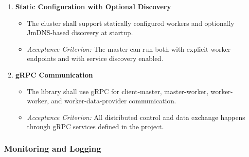 \documentclass{scrartcl}
\begin{document}
\begin{enumerate}[label=\textbf{FR-WDC-\arabic*}]
    \item \textbf{Static Configuration with Optional Discovery}
          \begin{itemize}
              \item The cluster shall support statically configured workers and optionally JmDNS-based discovery at startup.
              \item \textit{Acceptance Criterion:} The master can run both with explicit worker endpoints and with service discovery enabled.
          \end{itemize}


    \item \textbf{gRPC Communication}
          \begin{itemize}
              \item The library shall use gRPC for client-master, master-worker, worker-worker, and worker-data-provider communication.
              \item \textit{Acceptance Criterion:} All distributed control and data exchange happens through gRPC services defined in the project.
          \end{itemize}

\end{enumerate}

\subsubsection{Monitoring and Logging}
\end{document}
